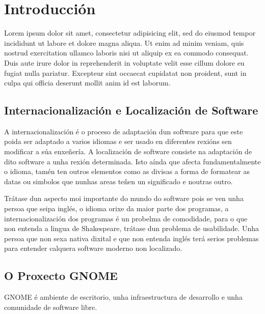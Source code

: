 %
%

\chapter[Introducción]{Introducción}

Lorem ipsum dolor sit amet, consectetur adipisicing elit, sed do eiusmod
tempor incididunt ut labore et dolore magna aliqua. Ut enim ad minim veniam,
quis nostrud exercitation ullamco laboris nisi ut aliquip ex ea commodo
consequat. Duis aute irure dolor in reprehenderit in voluptate velit esse
cillum dolore eu fugiat nulla pariatur. Excepteur sint occaecat cupidatat non
proident, sunt in culpa qui officia deserunt mollit anim id est laborum.

\section{Internacionalización e Localización de Software}
A internacionalización é o proceso de adaptación dun software para que este poida ser adaptado a varios idiomas e ser usado en diferentes rexións sen modificar a súa enxeñería. A localización de software consiste na adaptación de dito software a unha rexión determinada. Isto aínda que afecta fundamentalmente o idioma, tamén ten outros elementos como as divisas a forma de formatear as datas ou simbolos que nunhas areas teñen un significado e noutras outro.

Trátase dun aspecto moi importante do mundo do software pois se ven unha persoa que seipa inglés, o idioma orixe da maior parte dos programas, a internacionalización dos programas é un probelma de comodidade, para o que non entenda a lingua de Shakespeare, trátase dun problema de usabilidade. Unha persoa que non sexa nativa dixital e que non entenda inglés terá serios problemas para entender calquera software moderno non localizado.

\section{O Proxecto GNOME}
GNOME é ambiente de escritorio, unha infraestructura de desarrollo e unha comunidade de software libre.

